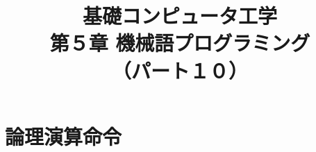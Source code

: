 \documentclass{beamer}                 %
\begin{document}
\title{基礎コンピュータ工学\\第５章 機械語プログラミング\\（パート１０）}
\date{}

\begin{frame}
  \titlepage
\end{frame}


\section{論理演算命令}
\end{document}

